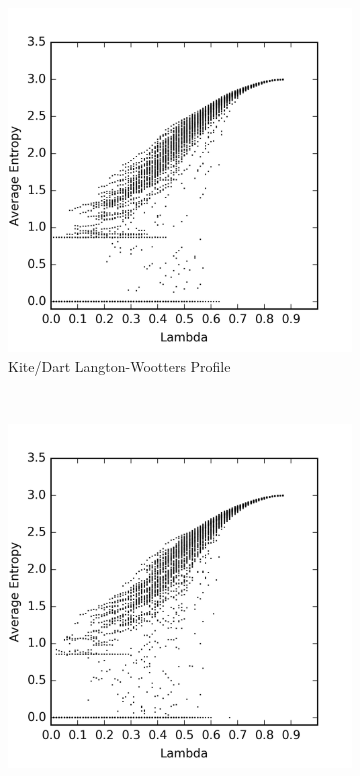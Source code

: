 \documentclass[a4paper,11pt]{article}
\begin{document}
\begin{figure}[htp]
\centering
\begin{subfigure}[t]{0.65\textwidth}
  \includegraphics[width=\textwidth]{ch6_figs/ckd_entropy_scatter}
  \caption{Kite/Dart Langton-Wootters Profile}
  \label{fig:ckd_lw_profile}
\end{subfigure}
~
\begin{subfigure}[t]{0.65\textwidth}
  \centering
  \includegraphics[width=\textwidth]{ch6_figs/crh_entropy_scatter}

\end{subfigure}
\end{figure}
\end{document}
